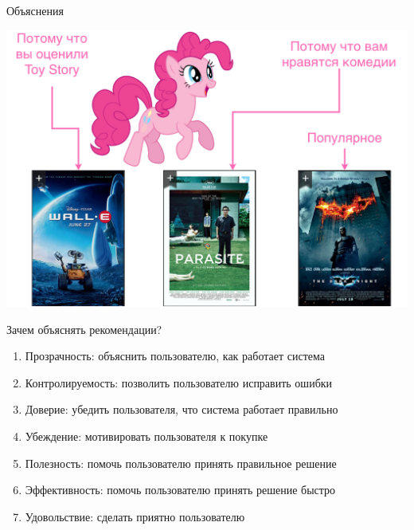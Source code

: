 \documentclass[11pt,aspectratio=169,handout]{beamer}
\begin{document}
\begin{frame}{Объяснения}

\begin{center}
\includegraphics[scale=0.22]{images/explainability-2.png}
\end{center}

\end{frame}

\begin{frame}{Зачем объяснять рекомендации?}

\begin{enumerate}[<+->]
\item Прозрачность: объяснить пользователю, как работает система
\item Контролируемость: позволить пользователю исправить ошибки
\item Доверие: убедить пользователя, что система работает правильно
\item Убеждение: мотивировать пользователя к покупке
\item Полезность: помочь пользователю принять правильное решение
\item Эффективность: помочь пользователю принять решение быстро
\item Удовольствие: сделать приятно пользователю
\end{enumerate}

\end{frame}
\end{document}
